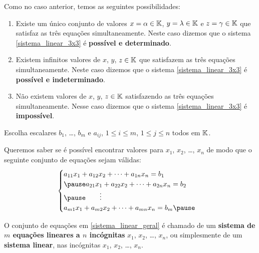 \documentclass{beamer}
\begin{document}
    \begin{frame}
        Como no caso anterior, temos as seguintes possibilidades:\pause
        \begin{enumerate}[label={\roman*})]
            \item Existe um único conjunto de valores $x = \alpha \in \mathbb{K}$, $y = \lambda \in \mathbb{K}$ e $z = \gamma \in \mathbb{K}$ \pause que satisfaz as três equações simultaneamente. \pause Neste caso dizemos que o sistema \eqref{sistema_linear_3x3} \pause é \textbf{possível e determinado}.\pause

            \item Existem infinitos valores de $x$, $y$, $z \in \mathbb{K}$ \pause que satisfazem as três equações simultaneamente. \pause Neste caso dizemos que o sistema \eqref{sistema_linear_3x3} \pause é \textbf{possível e indeterminado}.\pause

            \item Não existem valores de $x$, $y$, $z \in \mathbb{K}$ \pause satisfazendo as três equações simultaneamente. \pause Nesse caso dizemos que o sistema \eqref{sistema_linear_3x3} \pause é \textbf{impossível}.
        \end{enumerate}
    \end{frame}

    \begin{frame}

        Escolha escalares $b_1$, \dots, $b_m$ \pause e $a_{ij}$, \pause $1 \le i \le m$, $1 \le j \le n$ todos em $\mathbb{K}$.

        \vspace{.3cm}

        Queremos saber se é possível encontrar valores para  $x_1$, $x_2$, \dots, $x_n$ \pause de modo que o seguinte conjunto de equações sejam válidas: \pause
        \begin{equation}\label{sistema_linear_geral}
	    \begin{cases}
                a_{11}x_1 + a_{12}x_2 + \cdots + a_{1n}x_n = b_1\\\pause
                a_{21}x_1 + a_{22}x_2 + \cdots + a_{2n}x_n = b_2\\\pause
                \qquad \vdots\\
                a_{m1}x_1 + a_{m2}x_2 + \cdots + a_{mn}x_n = b_m\pause
            \end{cases}
        \end{equation}

        O conjunto de equações em \eqref{sistema_linear_geral} é chamado de um \pause \textbf{sistema de $m$ equa\c{c}\~oes lineares \pause a $n$ inc\'ognitas} $x_1$, $x_2$, \dots, $x_n$\pause , ou simplesmente de um \textbf{sistema linear}, nas incógnitas \pause $x_1$, $x_2$, \dots, $x_n$.
    \end{frame}
\end{document}
